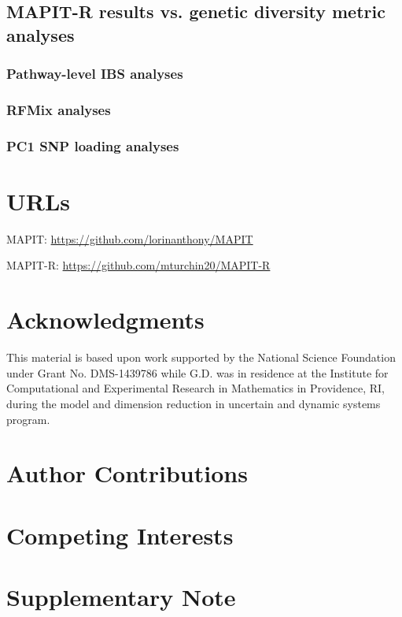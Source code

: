 \documentclass[12pt,a4paper]{article}
\begin{document}
\subsection{MAPIT-R results vs. genetic diversity metric analyses}
\subsubsection{Pathway-level IBS analyses}

\subsubsection{RFMix analyses}

\subsubsection{PC1 SNP loading analyses}

\section{URLs}\label{InterPath-URLs}

MAPIT: \url{https://github.com/lorinanthony/MAPIT}

MAPIT-R: \url{https://github.com/mturchin20/MAPIT-R}

\section{Acknowledgments}\label{InterPath-Acknowledgments}

This material is based upon work supported by the National Science Foundation under Grant No. DMS-1439786 while G.D. was in residence at the Institute for Computational and Experimental Research in Mathematics in Providence, RI, during the model and dimension reduction in uncertain and dynamic systems program.

\section{Author Contributions}\label{InterPath-Author-Contributions}

\section{Competing Interests}\label{InterPath-Competing-Interests}

\section{Supplementary Note}\label{Supplementary-Note}
\end{document}
